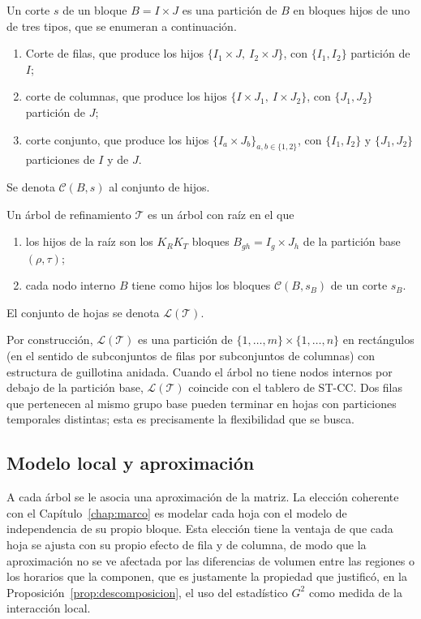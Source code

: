 \begin{definicion}\label{def:corte}
Un corte $s$ de un bloque $B = I\times J$ es una partición de $B$ en
bloques hijos de uno de tres tipos, que se enumeran a continuación.
\begin{enumerate}
  \item Corte de filas, que produce los hijos $\{I_1\times J,\ I_2\times J\}$, con
  $\{I_1,I_2\}$ partición de $I$;
  \item corte de columnas, que produce los hijos $\{I\times J_1,\ I\times J_2\}$, con
  $\{J_1,J_2\}$ partición de $J$;
  \item corte conjunto, que produce los hijos $\{I_a\times J_b\}_{a,b\in\{1,2\}}$, con
  $\{I_1,I_2\}$ y $\{J_1,J_2\}$ particiones de $I$ y de $J$.
\end{enumerate}
Se denota $\mathcal{C}(B,s)$ al conjunto de hijos.
\end{definicion}

\begin{definicion}\label{def:arbol}
Un árbol de refinamiento $\mathcal{T}$ es un árbol con raíz en el que
\begin{enumerate}
  \item los hijos de la raíz son los $K_R K_T$ bloques
  $B_{gh} = I_g\times J_h$ de la partición base $(\rho,\tau)$;
  \item cada nodo interno $B$ tiene como hijos los bloques
  $\mathcal{C}(B,s_B)$ de un corte $s_B$.
\end{enumerate}
El conjunto de hojas se denota $\mathcal{L}(\mathcal{T})$.
\end{definicion}

Por construcción, $\mathcal{L}(\mathcal{T})$ es una partición de
$\{1,\dots,m\}\times\{1,\dots,n\}$ en rectángulos (en el sentido de
subconjuntos de filas por subconjuntos de columnas) con estructura de
guillotina anidada. Cuando el árbol no tiene nodos internos por debajo de la
partición base, $\mathcal{L}(\mathcal{T})$ coincide con el tablero de ST-CC.
Dos filas que pertenecen al mismo grupo base pueden terminar en hojas con
particiones temporales distintas; esta es precisamente la flexibilidad que se
busca.

\subsection{Modelo local y aproximación}

A cada árbol se le asocia una aproximación de la matriz. La elección coherente
con el Capítulo~\ref{chap:marco} es modelar cada hoja con el modelo de
independencia de su propio bloque. Esta elección tiene la ventaja de que cada hoja
se ajusta con su propio efecto de fila y de columna, de modo que la aproximación
no se ve afectada por las diferencias de volumen entre las regiones o los
horarios que la componen, que es justamente la propiedad que justificó, en la
Proposición~\ref{prop:descomposicion}, el uso del estadístico $G^2$ como medida
de la interacción local.

